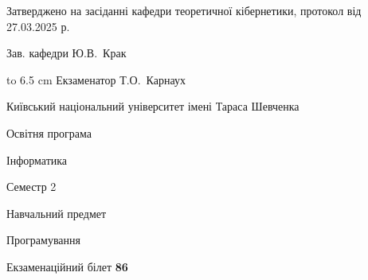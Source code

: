 \documentclass[12pt, ukrainian]{article}
\begin{document}
{\smallskip\smallskip \begin {scriptsize} Затверджено на засіданні кафедри теоретичної кібернетики, протокол   від   27.03.2025 р.\par\smallskip\smallskip\smallskip\smallskip
{\parbox {6.5 cm} {Зав. кафедри \dotfill Ю.В.~Крак}}\hspace {0.7cm} {\hbox to 6.5 cm { Екзаменатор \dotfill Т.О.~Карнаух}} \end{scriptsize}}
\newpage
{{\begin {scriptsize}\par
{ \center  Київський національний університет імені Тараса Шевченка \par}
{\parbox {5 cm}{Освітня програма \hfill}{\parbox {7 cm}{Інформатика\hfill}}\parbox {6 cm}{\hfill Семестр 2}}\par
{\parbox {5 cm} {Навчальний предмет \hfill}\parbox {7 cm}{Програмування \hfill}\parbox {6cm}{\hfill}\par}\vspace{-15pt} \end{scriptsize}}{\center Екзаменаційний білет \No \textbf { 86 }\par}}
\end{document}
